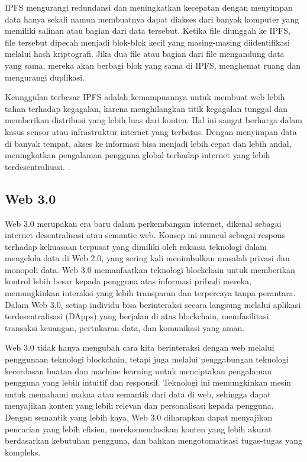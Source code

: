 IPFS mengurangi redundansi dan meningkatkan kecepatan dengan menyimpan data hanya sekali namun membuatnya dapat diakses dari banyak komputer yang memiliki salinan atau bagian dari data tersebut. Ketika file diunggah ke IPFS, file tersebut dipecah menjadi blok-blok kecil yang masing-masing diidentifikasi melalui hash kriptografi. Jika dua file atau bagian dari file mengandung data yang sama, mereka akan berbagi blok yang sama di IPFS, menghemat ruang dan mengurangi duplikasi.

Keunggulan terbesar IPFS adalah kemampuannya untuk membuat web lebih tahan terhadap kegagalan, karena menghilangkan titik kegagalan tunggal dan memberikan distribusi yang lebih luas dari konten. Hal ini sangat berharga dalam kasus sensor atau infrastruktur internet yang terbatas. Dengan menyimpan data di banyak tempat, akses ke informasi bisa menjadi lebih cepat dan lebih andal, meningkatkan pengalaman pengguna global terhadap internet yang lebih terdesentralisasi. \parencite{Steichen18}.

\subsection{Web 3.0}
Web 3.0 merupakan era baru dalam perkembangan internet, dikenal sebagai internet desentralisasi atau semantic web. Konsep ini muncul sebagai respons terhadap kekuasaan terpusat yang dimiliki oleh raksasa teknologi dalam mengelola data di Web 2.0, yang sering kali menimbulkan masalah privasi dan monopoli data. Web 3.0 memanfaatkan teknologi blockchain untuk memberikan kontrol lebih besar kepada pengguna atas informasi pribadi mereka, memungkinkan interaksi yang lebih transparan dan terpercaya tanpa perantara. Dalam Web 3.0, setiap individu bisa berinteraksi secara langsung melalui aplikasi terdesentralisasi (DApps) yang berjalan di atas blockchain, memfasilitasi transaksi keuangan, pertukaran data, dan komunikasi yang aman. \parencite{RAY2023213}

Web 3.0 tidak hanya mengubah cara kita berinteraksi dengan web melalui penggunaan teknologi blockchain, tetapi juga melalui penggabungan teknologi kecerdasan buatan dan machine learning untuk menciptakan pengalaman pengguna yang lebih intuitif dan responsif. Teknologi ini memungkinkan mesin untuk memahami makna atau semantik dari data di web, sehingga dapat menyajikan konten yang lebih relevan dan personalisasi kepada pengguna. Dengan semantik yang lebih kaya, Web 3.0 diharapkan dapat menyajikan pencarian yang lebih efisien, merekomendasikan konten yang lebih akurat berdasarkan kebutuhan pengguna, dan bahkan mengotomatisasi tugas-tugas yang kompleks. \parencite{Chohan2022}

